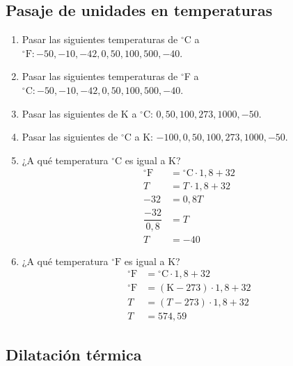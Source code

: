 \subsection*{Pasaje de unidades en temperaturas}

\begin{enumerate}
\item Pasar las siguientes temperaturas de $^\circ$C a $^\circ\text{F}: -50, -10, -42, 0, 50, 100, 500, -40$.

\item Pasar las siguientes temperaturas de $^\circ$F a $^\circ\text{C}: -50, -10, -42, 0, 50, 100, 500, -40$.

\item Pasar las siguientes de K a $^\circ$C: $0, 50, 100, 273, 1000, -50$.

\item Pasar las siguientes de $^\circ$C a K: $-100, 0, 50, 100, 273, 1000, -50$.

\item ¿A qué temperatura $\text{$^\circ$C}$ es igual a K?
\begin{align*}
    ^\circ\text{F}&= \text{$^\circ$C} \cdot 1,8 + 32\\
    T &= T \cdot 1,8 + 32\\
    -32 &= 0,8 T\\
    \dfrac{-32}{0,8} &= T\\
    T &= -40
\end{align*}

\item ¿A qué temperatura $\text{$^\circ$F}$ es igual a K?
\begin{align*}
    ^\circ\text{F}&= \text{$^\circ$C} \cdot 1,8 + 32\\
    ^\circ\text{F}&= (\text{K}-273) \cdot 1,8 + 32\\
    T&= (T-273) \cdot 1,8 + 32\\
    T &= 574,59
\end{align*}
\end{enumerate}


\subsection*{Dilatación térmica}
